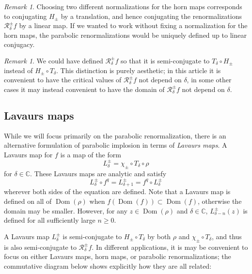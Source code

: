\documentclass[12pt,letterpaper]{amsart}
\numberwithin{equation}{section}
\theoremstyle{remark}
\newtheorem{remark}[equation]{Remark}
\theoremstyle{definition}
\newcommand{\C}{\mathbb C}
\newcommand{\RR}{\mathcal R}
\DeclareMathOperator{\Dom}{Dom}
\begin{document}
	\begin{remark}
		Choosing two different normalizations for the horn maps corresponds to conjugating $H_\pm$ by a translation, and hence conjugating the renormalizations $\RR_\delta^\pm f$ by a linear map. If we wanted to work without fixing a normalization for the horn maps, the parabolic renormalizations would be uniquely defined up to linear conjugacy.
	\end{remark}
	
	
	
	\begin{remark}
		We could have  defined $\mathcal{R}^\pm_\delta f$ so that it is semi-conjugate 
		to $T_\delta\circ H_\pm$ instead of $H_\pm\circ T_\delta$. This distinction is purely aesthetic; in this article it is convenient to have the critical values of $\mathcal{R}_\delta^\pm f$ not depend on $\delta$, in some other cases it may instead convenient to have the domain of $\mathcal{R}_\delta^\pm f$ not depend on $\delta.$
	\end{remark}
	
	
	\subsection{Lavaurs maps}
	
	While we will focus primarily on the parabolic renormalization, there is an alternative formulation of parabolic implosion in terms of \textit{Lavaurs maps}. 
	A Lavaurs map for $f$ is a map of the form 
	$$L_\delta^\pm= \chi_\pm\circ T_\delta\circ \rho$$
	for $\delta\in \C$.
	These Lavaurs maps are analytic and satisfy 
	$$L_{\delta}^\pm\circ f^q= L_{\delta+1}^\pm= f^q\circ L_{\delta}^\pm$$
	wherever both sides of the equation are defined. Note that a Lavaurs map
	is defined on all of $\Dom(\rho)$ when $f(\Dom(f))\subset \Dom(f)$, otherwise the domain may be smaller. However, for any $z\in \Dom(\rho)$ and $\delta\in \C$, $L_{\delta-n}^\pm(z)$ is defined for all sufficiently large $n\geq 0$.
	
	A Lavaurs map $L_{\delta}^\pm$ is semi-conjugate to $H_{\pm}\circ T_\delta$ by both $\rho$ and $\chi_\pm\circ T_\delta$, and thus is also semi-conjugate to $\RR_\delta^\pm f$.
	In different applications, it is may be convenient to focus on either  Lavaurs maps,  horn maps, or  parabolic renormalizations; the commutative diagram below shows explicitly how they are all related:
	
\end{document}
